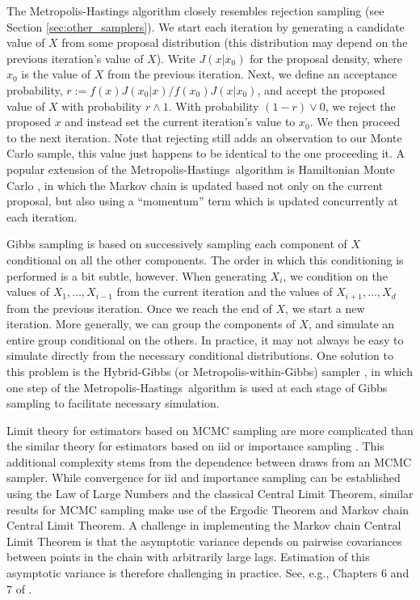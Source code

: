 \documentclass[ss]{imsart}
\theoremstyle{plain}
\theoremstyle{definition}
\theoremstyle{remark}
\newcommand{\mh}{Metropolis-Hastings}
\begin{document}
The Metropolis-Hastings algorithm closely resembles rejection sampling (see Section \ref{sec:other_samplers}). We start each iteration by generating a candidate value of $X$ from some proposal distribution (this distribution may depend on the previous iteration's value of $X$). Write $J(x | x_0)$ for the proposal density, where $x_0$ is the value of $X$ from the previous iteration. Next, we define an acceptance probability, $r := f(x) J(x_0 | x) / f(x_0) J(x | x_0)$, and accept the proposed value of $X$ with probability $r \wedge 1$. With probability $(1-r) \vee 0$, we reject the proposed $x$ and instead set the current iteration's value to $x_0$. We then proceed to the next iteration. Note that rejecting still adds an observation to our Monte Carlo sample, this value just happens to be identical to the one proceeding it. A popular extension of the \mh\ algorithm is Hamiltonian Monte Carlo \citep[see Section 12.4 of][]{Gel13}, in which the Markov chain is updated based not only on the current proposal, but also using a ``momentum'' term which is updated concurrently at each iteration.

Gibbs sampling is based on successively sampling each component of $X$ conditional on all the other components. The order in which this conditioning is performed is a bit subtle, however. When generating $X_i$, we condition on the values of $X_1,\ldots, X_{i-1}$ from the current iteration and the values of $X_{i+1}, \ldots, X_d$ from the previous iteration. Once we reach the end of $X$, we start a new iteration.  More generally, we can group the components of $X$, and simulate an entire group conditional on the others. In practice, it may not always be easy to simulate directly from the necessary conditional distributions. One solution to this problem is the Hybrid-Gibbs (or Metropolis-within-Gibbs) sampler \citet[see Section 10.3.3 of][]{Rob04}, in which one step of the \mh\ algorithm is used at each stage of Gibbs sampling to facilitate necessary simulation.

Limit theory for estimators based on MCMC sampling are more complicated than the similar theory for estimators based on iid or importance sampling \citep{Gey91}. This additional complexity stems from the dependence between draws from an MCMC sampler. While convergence for iid and importance sampling can be established using the Law of Large Numbers and the classical Central Limit Theorem, similar results for MCMC sampling make use of the Ergodic Theorem and Markov chain Central Limit Theorem. A challenge in implementing the Markov chain Central Limit Theorem is that the asymptotic variance depends on pairwise covariances between points in the chain with arbitrarily large lags. Estimation of this asymptotic variance is therefore challenging in practice. See, e.g., Chapters 6 and 7 of \citet{Rob04}.
\end{document}

